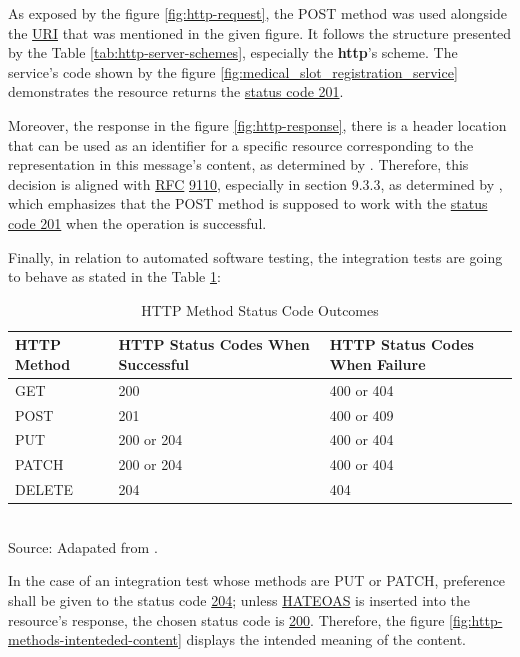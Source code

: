 As exposed by the figure \ref{fig:http-request}, the POST method was used alongside the \hyperref[appendix:glossary]{URI} that was mentioned in the given figure. It follows the structure presented by the Table \ref{tab:http-server-schemes}, especially the \textbf{http}'s scheme. The service's code shown by the figure \ref{fig:medical_slot_registration_service} demonstrates the resource returns the \hyperref[tab:summary_http_status_codes]{status code 201}. 

Moreover, the response in the figure \ref{fig:http-response}, there is a header location that can be used as an identifier for a specific resource corresponding to the representation in this message's content, as determined by \cite{rfc9110}. Therefore, this decision is aligned with \hyperref[appendix:glossary]{RFC} \href{https://www.rfc-editor.org/rfc/rfc9110.html}{9110}, especially in section 9.3.3, as determined by \cite{rfc9110}, which emphasizes that the POST method is supposed to work with the \hyperref[tab:summary_http_status_codes]{status code 201} when the operation is successful.

Finally, in relation to automated software testing, the integration tests are going to behave as stated in the
Table \ref{tab:related-statuses-methods}:

\begin{table}[H]
\centering  
\caption{HTTP Method Status Code Outcomes}   
\label{tab:related-statuses-methods}    
\begin{tabular}{lll}
\textbf{HTTP Method} & \textbf{HTTP Status Codes When Successful} & \textbf{HTTP Status Codes When Failure} \\   
\hline   
GET & 200 & 400 or 404 \\ \hline   
POST & 201 & 400 or 409 \\ \hline   
PUT & 200 or 204 & 400 or 404 \\ \hline   
PATCH & 200 or 204 & 400 or 404 \\ \hline   
DELETE & 204 & 404 \\ \hline   
\end{tabular}  
\\ \footnotesize Source: Adapated from \cite{rfc9110}.
\end{table}

In the case of an integration test whose methods are PUT or PATCH, preference shall be given to the status code \hyperref[tab:summary_http_status_codes]{204}; 
unless \hyperref[appendix:glossary]{HATEOAS} is inserted into the resource's response, the chosen status code is \hyperref[tab:summary_http_status_codes]{200}. Therefore, the figure \ref{fig:http-methods-intenteded-content} displays the intended meaning of the content.

